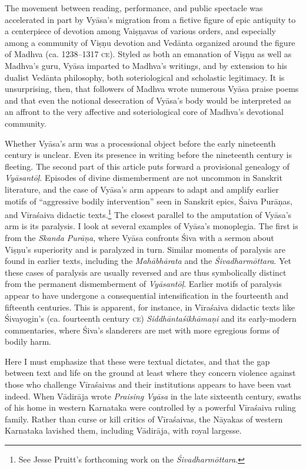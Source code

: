 The movement between reading, performance, and public spectacle was accelerated in part by Vyāsa’s migration from a fictive figure of epic antiquity to a centerpiece of devotion among Vaiṣṇavas of various orders, and especially among a community of Viṣṇu devotion and Vedānta organized around the figure of Madhva (ca. 1238–1317 \textsc{ce}). Styled as both an emanation of Viṣṇu as well as Madhva’s guru, Vyāsa imparted to Madhva’s writings, and by extension to his dualist Vedānta philosophy, both soteriological and scholastic legitimacy. It is unsurprising, then, that followers of Madhva wrote numerous Vyāsa praise poems and that even the notional desecration of Vyāsa’s body would be interpreted as an affront to the very affective and soteriological core of Madhva’s devotional community.


Whether Vyāsa’s arm was a processional object before the early nineteenth century is unclear. Even its presence in writing before the nineteenth century is fleeting. The second part of this article puts forward a provisional genealogy of \emph{Vyāsantōḷ}. Episodes of divine dismemberment are not uncommon in Sanskrit literature, and the case of Vyāsa’s arm appears to adapt and amplify earlier motifs of “aggressive bodily intervention” seen in Sanskrit epics, Śaiva Purāṇas, and Vīraśaiva didactic texts.\footnote{%
See Jesse Pruitt’s forthcoming work on the \emph{{Śivadharmōttara}}.
}
 The closest parallel to the amputation of Vyāsa’s arm is its paralysis. I look at several examples of Vyāsa’s monoplegia. The first is from the \emph{{Skanda Purāṇa}}, where Vyāsa confronts Śiva with a sermon about Viṣṇu’s superiority and is paralyzed in turn. Similar moments of paralysis are found in earlier texts, including the \emph{Mahābhārata} and the \emph{{Śivadharmōttara}}. Yet these cases of paralysis are usually reversed and are thus symbolically distinct from the permanent dismemberment of \emph{{Vyāsantōḷ}}. Earlier motifs of paralysis appear to have undergone a consequential intensification in the fourteenth and fifteenth centuries. This is apparent, for instance, in Vīraśaiva didactic texts like Śivayogin’s (ca. fourteenth century \textsc{ce}) \emph{{Siddhāntaśikhāmaṇi}} and its early-modern commentaries, where Śiva’s slanderers are met with more egregious forms of bodily harm. 


Here I must emphasize that these were textual dictates, and that the gap between text and life on the ground  \Dash  at least where they concern violence against those who challenge Vīraśaivas and their institutions  \Dash  appears to have been vast indeed. When Vādirāja wrote \emph{Praising Vyāsa} in the late sixteenth century, swaths of his home in western Karnataka were controlled by a powerful Vīraśaiva ruling family. Rather than curse or kill critics of Vīraśaivas, the Nāyakas of western Karnataka lavished them, including Vādirāja, with royal largesse.


